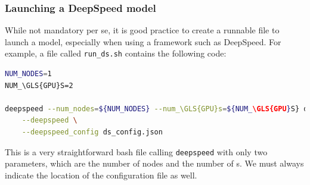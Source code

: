 \documentclass{article}
\begin{document}
\subsubsection{Launching a DeepSpeed model}
While not mandatory per se, it is good practice to create a runnable file to launch a model, especially when using a framework such as DeepSpeed. For example, a file called \lstinline{run_ds.sh} contains the following code:
\begin{lstlisting}[language=bash]
NUM_NODES=1
NUM_\GLS{GPU}S=2

deepspeed --num_nodes=${NUM_NODES} --num_\GLS{GPU}s=${NUM_\GLS{GPU}S} deepspeed_model.py \
	--deepspeed \
	--deepspeed_config ds_config.json
\end{lstlisting}
This is a very straightforward bash file calling \lstinline{deepspeed} with only two parameters, which are the number of nodes and the number of s. We must always indicate the location of the configuration file as well.

\clearpage
\printglossaries

\clearpage


\clearpage

\end{document}

